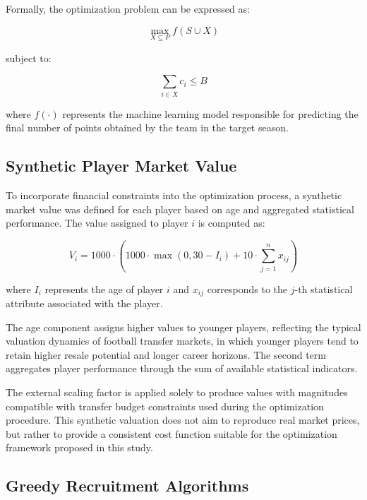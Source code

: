 \documentclass[a4paper,fleqn]{cas-sc}
\begin{document}
Formally, the optimization problem can be expressed as:

\begin{equation}
\max_{X \subseteq P} f(S \cup X)
\end{equation}

subject to:

\begin{equation}
\sum_{i \in X} c_i \leq B
\end{equation}

where $f(\cdot)$ represents the machine learning model responsible for predicting the final number of points obtained by the team in the target season.

\subsection{Synthetic Player Market Value}

To incorporate financial constraints into the optimization process, a synthetic market value was defined for each player based on age and aggregated statistical
performance. The value assigned to player $i$ is computed as:

\begin{equation}
V_i = 1000 \cdot \left( 1000 \cdot \max(0, 30 - I_i) + 10 \cdot \sum_{j=1}^{n} x_{ij} \right)
\end{equation}

where $I_i$ represents the age of player $i$ and $x_{ij}$ corresponds to the $j$-th statistical attribute associated with the player.

The age component assigns higher values to younger players, reflecting the typical valuation dynamics of football transfer markets, in which younger
players tend to retain higher resale potential and longer career horizons. The second term aggregates player performance through the sum of available
statistical indicators.

The external scaling factor is applied solely to produce values with magnitudes compatible with transfer budget constraints used during the optimization
procedure. This synthetic valuation does not aim to reproduce real market prices, but rather to provide a consistent cost function suitable for the optimization
framework proposed in this study.

\subsection{Greedy Recruitment Algorithms}
\end{document}
